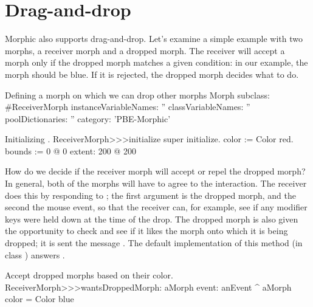 \documentclass[a4paper,10pt,twoside]{book}
\begin{document}

\section{Drag-and-drop}

Morphic also supports drag-and-drop. Let's examine a simple example with two morphs, a receiver morph and a dropped morph. 
The receiver will accept a morph only if the dropped morph matches a given condition: in our example,  the morph should be blue. If it is rejected, the dropped morph decides what to do.

\begin{classdef}{Defining a morph on which we can drop other morphs}
Morph subclass: #ReceiverMorph
	instanceVariableNames: ''
	classVariableNames: ''
	poolDictionaries: ''
	category: 'PBE-Morphic'
\end{classdef}

\begin{method}{Initializing .}
ReceiverMorph>>>initialize
	super initialize.
	color := Color red.
	bounds := 0 @ 0 extent: 200 @ 200
\end{method}

How do we decide if the receiver morph will accept or repel the dropped morph?
In general, both of the morphs will have to agree to the interaction.
The receiver does this by responding to ; the first argument is the dropped morph, and the second the mouse event, so that the receiver can, for example, see if any modifier keys were held down at the time of the drop. 
The dropped morph is also given the opportunity to check and see if it likes the morph onto which it is being dropped; it is sent the message .  The default implementation of  this method (in class ) answers .

\begin{method}{Accept dropped morphs based on their color.}
ReceiverMorph>>>wantsDroppedMorph: aMorph event: anEvent
	^ aMorph color = Color blue
\end{method}
\end{document}
